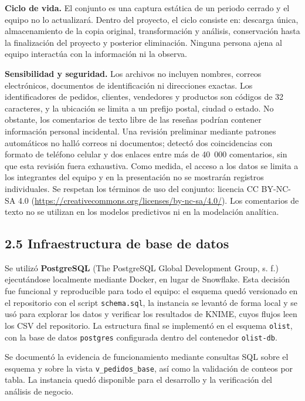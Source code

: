 \documentclass[a4paper,stu,12pt,donotrepeattitle,floatsintext]{apa7}
\begin{document}
\textbf{Ciclo de vida.} El conjunto es una captura estática de un periodo cerrado y el equipo no lo actualizará. Dentro del proyecto, el ciclo consiste en: descarga única, almacenamiento de la copia original, transformación y análisis, conservación hasta la finalización del proyecto y posterior eliminación. Ninguna persona ajena al equipo interactúa con la información ni la observa.

\textbf{Sensibilidad y seguridad.} Los archivos no incluyen nombres, correos electrónicos, documentos de identificación ni direcciones exactas. Los identificadores de pedidos, clientes, vendedores y productos son códigos de 32 caracteres, y la ubicación se limita a un prefijo postal, ciudad o estado. No obstante, los comentarios de texto libre de las reseñas podrían contener información personal incidental. Una revisión preliminar mediante patrones automáticos no halló correos ni documentos; detectó dos coincidencias con formato de teléfono celular y dos enlaces entre más de 40~000 comentarios, sin que esta revisión fuera exhaustiva. Como medida, el acceso a los datos se limita a los integrantes del equipo y en la presentación no se mostrarán registros individuales. Se respetan los términos de uso del conjunto: licencia CC BY-NC-SA 4.0 (\url{https://creativecommons.org/licenses/by-nc-sa/4.0/}). Los comentarios de texto no se utilizan en los modelos predictivos ni en la modelación analítica.

\subsection{2.5 Infraestructura de base de datos}
Se utilizó \textbf{PostgreSQL} (The PostgreSQL Global Development Group, s. f.) ejecutándose localmente mediante Docker, en lugar de Snowflake. Esta decisión fue funcional y reproducible para todo el equipo: el esquema quedó versionado en el repositorio con el script \texttt{schema.sql}, la instancia se levantó de forma local y se usó para explorar los datos y verificar los resultados de KNIME, cuyos flujos leen los CSV del repositorio. La estructura final se implementó en el esquema \texttt{olist}, con la base de datos \texttt{postgres} configurada dentro del contenedor \texttt{olist-db}.

Se documentó la evidencia de funcionamiento mediante consultas SQL sobre el esquema y sobre la vista \texttt{v\_\allowbreak{}pedidos\_\allowbreak{}base}, así como la validación de conteos por tabla. La instancia quedó disponible para el desarrollo y la verificación del análisis de negocio.
\end{document}
